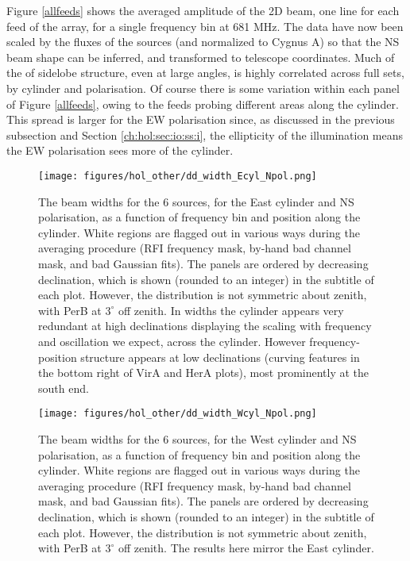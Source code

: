 Figure \ref{allfeeds} shows the averaged amplitude of the 2D beam, one line for each feed of the array, for a single frequency bin at 681 MHz. The data have now been scaled by the fluxes of the sources (and normalized to Cygnus A) so that the NS beam shape can be inferred, and transformed to telescope coordinates. Much of the of sidelobe structure, even at large angles, is highly correlated across full sets, by cylinder and polarisation. Of course there is some variation within each panel of Figure \ref{allfeeds}, owing to the feeds probing different areas along the cylinder. This spread is larger for the EW polarisation since, as discussed in the previous subsection and Section \ref{ch:hol:sec:io:ss:i}, the ellipticity of the illumination means the EW polarisation sees more of the cylinder.

\begin{figure}[h!]
\begin{center}
\texttt{[image: figures/hol\_other/dd\_width\_Ecyl\_Npol.png]}
\caption{The beam widths for the 6 sources, for the East cylinder and NS polarisation, as a function of frequency bin and position along the cylinder. White regions are flagged out in various ways during the averaging procedure (RFI frequency mask, by-hand bad channel mask, and bad Gaussian fits). The panels are ordered by decreasing declination, which is shown (rounded to an integer) in the subtitle of each plot. However, the distribution is not symmetric about zenith, with PerB at $3^{\circ}$ off zenith. In widths the cylinder appears very redundant at high declinations displaying the scaling with frequency and oscillation we expect, across the cylinder. However frequency-position structure appears at low declinations (curving features in the bottom right of VirA and HerA plots), most prominently at the south end.}
\end{center}
\end{figure}

\begin{figure}[h!]
\begin{center}
\texttt{[image: figures/hol\_other/dd\_width\_Wcyl\_Npol.png]}
\caption{The beam widths for the 6 sources, for the West cylinder and NS polarisation, as a function of frequency bin and position along the cylinder. White regions are flagged out in various ways during the averaging procedure (RFI frequency mask, by-hand bad channel mask, and bad Gaussian fits). The panels are ordered by decreasing declination, which is shown (rounded to an integer) in the subtitle of each plot. However, the distribution is not symmetric about zenith, with PerB at $3^{\circ}$ off zenith. \newline The results here mirror the East cylinder.}
\end{center}
\end{figure}

